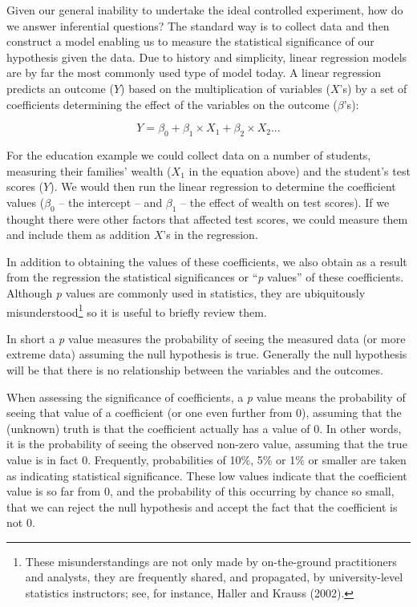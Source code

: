 \documentclass[]{memoir}
\begin{document}
Given our general inability to undertake the ideal controlled
experiment, how do we answer inferential questions? The standard way is
to collect data and then construct a model enabling us to measure the
statistical significance of our hypothesis given the data. Due to
history and simplicity, linear regression models are by far the most
commonly used type of model today. A linear regression predicts an
outcome ($Y$) based on the multiplication of variables ($X$'s) by a set
of coefficients determining the effect of the variables on the outcome
($\beta$'s):

\[ Y = \beta_0 + \beta_1 \times X_1 + \beta_2 \times X_2 ... \]

For the education example we could collect data on a number of students,
measuring their families' wealth ($X_1$ in the equation above) and the
student's test scores ($Y$). We would then run the linear regression to
determine the coefficient values ($\beta_0$ -- the intercept -- and
$\beta_1$ -- the effect of wealth on test scores). If we thought there
were other factors that affected test scores, we could measure them and
include them as addition $X$'s in the regression.

In addition to obtaining the values of these coefficients, we also
obtain as a result from the regression the statistical significances or
``\emph{p} values'' of these coefficients. Although \emph{p} values are
commonly used in statistics, they are ubiquitously
misunderstood\footnote{These misunderstandings are not only made by
  on-the-ground practitioners and analysts, they are frequently shared,
  and propagated, by university-level statistics instructors; see, for
  instance, Haller and Krauss (2002).} so it is useful to briefly review
them.

In short a \emph{p} value measures the probability of seeing the
measured data (or more extreme data) assuming the null hypothesis is
true. Generally the null hypothesis will be that there is no
relationship between the variables and the outcomes.

When assessing the significance of coefficients, a \emph{p} value means
the probability of seeing that value of a coefficient (or one even
further from 0), assuming that the (unknown) truth is that the
coefficient actually has a value of 0. In other words, it is the
probability of seeing the observed non-zero value, assuming that the
true value is in fact 0. Frequently, probabilities of 10\%, 5\% or 1\%
or smaller are taken as indicating statistical significance. These low
values indicate that the coefficient value is so far from 0, and the
probability of this occurring by chance so small, that we can reject the
null hypothesis and accept the fact that the coefficient is not 0.
\end{document}
